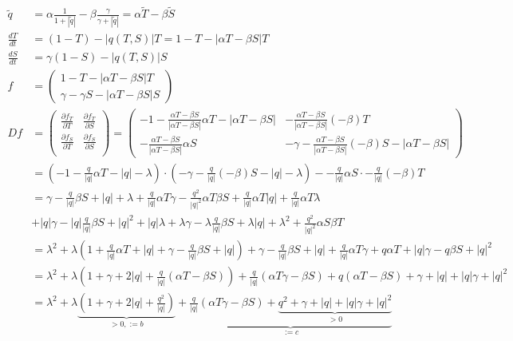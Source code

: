 \documentclass[11pt,a4paper]{article}
\begin{document}
	\newpage
	\begin{align*}
		\tilde{q} &= \alpha \frac{1}{1+ |\tilde{q}| } - \beta \frac{\gamma}{\gamma + |\tilde{q}| } = \alpha \tilde{T} - \beta \tilde{S} \\
		\frac{dT}{dt} &= (1 - T) - |q(T,S)|T = 1 - T - |\alpha T - \beta S|T \\
		\frac{dS}{dt} &= \gamma(1 - S) - |q(T,S)|S \\
		f &= \left(\begin{array}{c}
			1 - T - |\alpha T - \beta S|T \\
			\gamma - \gamma S - |\alpha T - \beta S|S
		\end{array}\right) \\
		Df &= \left(\begin{array}{cc}
			\frac{\partial f_T}{\partial T} & \frac{\partial f_T}{\partial S} \\
			\frac{\partial f_S}{\partial T} & \frac{\partial f_S}{\partial S} \\
		\end{array}\right) = \left(\begin{array}{cc}
			-1 - \frac{\alpha T - \beta S}{|\alpha T - \beta S|}\alpha T - |\alpha T - \beta S| &
			-\frac{\alpha T - \beta S}{|\alpha T - \beta S|}(-\beta) T \\
			-\frac{\alpha T - \beta S}{|\alpha T - \beta S|}\alpha S &
			-\gamma -\frac{\alpha T - \beta S}{|\alpha T - \beta S|}(-\beta) S - |\alpha T - \beta S|
		\end{array}\right) \\
		&= \left(-1 - \frac{q}{|q|}\alpha T - |q| - \lambda\right)\cdot \left( -\gamma - \frac{q}{|q|}(-\beta) S - |q|- \lambda \right) - -\frac{q}{|q|}\alpha S \cdot  -\frac{q}{|q|}(-\beta) T \\
		&= \gamma - \frac{q}{|q|}\beta S + |q| + \lambda 
		+ \frac{q}{|q|}\alpha T\gamma - \frac{q^2}{|q|^2}\alpha T \beta S + \frac{q}{|q|} \alpha T |q| + \frac{q}{|q|}\alpha T\lambda \\
		&+ |q|\gamma - |q|\frac{q}{|q|} \beta S + |q|^2 + |q|\lambda
		+ \lambda \gamma - \lambda\frac{q}{|q|}\beta S + \lambda|q| + \lambda^2
		+ \frac{q^2}{|q|^2}\alpha S \beta T \\
		&= \lambda^2 + \lambda\left( 1 + \frac{q}{|q|}\alpha T + |q| + \gamma - \frac{q}{|q|}\beta S + |q| \right) 
		+ \gamma - \frac{q}{|q|}\beta S + |q| + \frac{q}{|q|}\alpha T \gamma + q\alpha T + |q|\gamma - q\beta S + |q|^2 \\
		&= \lambda^2 
		+ \lambda\left( 1  + \gamma + 2|q| + \frac{q}{|q|}(\alpha T - \beta S) \right) 
		+ \frac{q}{|q|}(\alpha T \gamma - \beta S) + q(\alpha T - \beta S) + \gamma + |q| + |q|\gamma + |q|^2 \\
		&= \lambda^2 
		+ \lambda \underbrace{\left( 1  + \gamma + 2|q| + \frac{q^2}{|q|} \right)}_{>0, := b}
		+ \underbrace{\frac{q}{|q|}(\alpha T \gamma - \beta S) + \underbrace{q^2 + \gamma + |q| + |q|\gamma + |q|^2}_{> 0}}_{:= c}
	\end{align*}		
	
\end{document}
